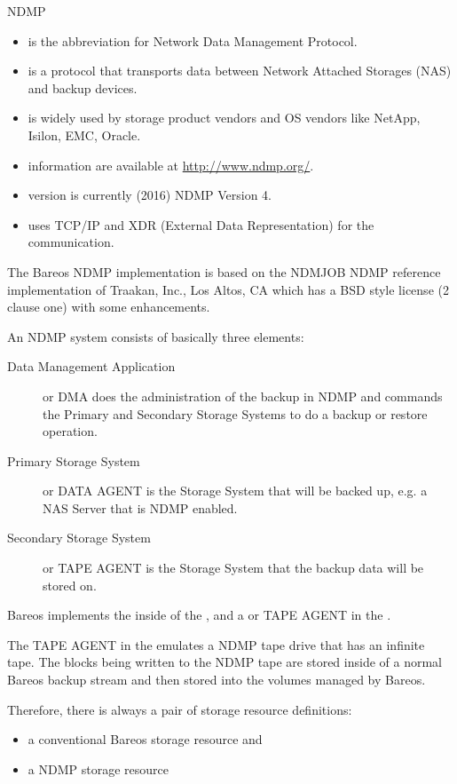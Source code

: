 
NDMP
\begin{itemize}
    \item is the abbreviation for Network Data Management Protocol.
    \item is a protocol that transports data between Network Attached Storages (NAS) and backup devices.
    \item is widely used by storage product vendors and OS vendors like NetApp, Isilon, EMC, Oracle.
    \item information are available at \url{http://www.ndmp.org/}.
    \item version is currently (2016) NDMP Version 4.
    \item uses TCP/IP and XDR (External Data Representation) for the communication.
\end{itemize}



The Bareos NDMP implementation is based on the NDMJOB NDMP reference implementation of Traakan, Inc., Los Altos, CA which has a BSD style license (2 clause one) with some enhancements.


An NDMP system consists of basically three elements:

\begin{description}
    \item[Data Management Application] or DMA does the administration of the backup in NDMP and commands the Primary and Secondary Storage Systems to do a backup or restore operation.
    \item[Primary Storage System] or DATA AGENT is the Storage System that will be backed up, e.g. a NAS Server that is NDMP enabled.
    \item[Secondary Storage System] or TAPE AGENT is the Storage System that the backup data will be stored on.
\end{description}

Bareos implements the  inside of the \bareosDir, and a  or TAPE AGENT in the \bareosSd.

The TAPE AGENT in the \bareosSd emulates a NDMP tape drive that has an infinite tape.
The blocks being written to the NDMP tape are stored inside of a normal Bareos backup stream
and then stored into the volumes managed by Bareos.

Therefore, there is always a pair of storage resource definitions:
\begin{itemize}
    \item a conventional Bareos storage resource and
    \item a NDMP storage resource
\end{itemize}

